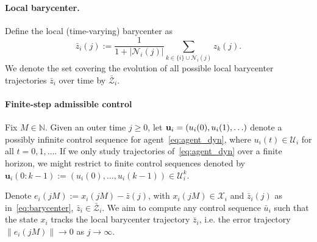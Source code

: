\documentclass[12pt,draftcls,onecolumn]{IEEEtran}
\def\field#1{\mathbb #1}%
\def\N{\field{N}}%
\newcommand{\X}{\ensuremath{\mathcal X}}
\newcommand{\U}{\ensuremath{\mathcal U}}
\def\Zb{\bar{\mathcal{Z}}}
\def\zbi{\bar{z}_i}
\begin{document}
\paragraph{Local barycenter.}
Define the local (time-varying) barycenter as
\begin{equation}\label{eq:barycenter}
\bar z_i(j):=\frac{1}{1+|\mathcal{N}_i(j)|}\sum_{k\in\{i\}\cup\mathcal{N}_i(j)} z_k(j).    
\end{equation}
We denote the set covering the evolution of all possible local barycenter trajectories $\zbi$ over time by $\Zb_i$.

\paragraph{Finite-step admissible control}
Fix $M\in\N$.
Given an outer time $j \geq 0$, let ${\bf u}_i = (u_i(0), u_i(1), \ldots)$ denote a possibly infinite control sequence for agent~\eqref{eq:agent_dyn}, where $u_i(t)\in \U_i$ for all $t=0,1,\ldots$.
If we only study trajectories of~\eqref{eq:agent_dyn} over a finite horizon, we might restrict to finite control sequences denoted by $\mathbf{u}_i(0:k-1) := (u_i(0),\dots,u_i(k-1)) \in \U_i^k$.


Denote $e_i (jM) := x_i(jM) - \bar{z}(j)$, with $x_i(jM) \in \X_i$ and $\bar{z}_i(j)$ as in~\eqref{eq:barycenter}, $\bar{z}_i \in \Zb_i$.
We aim to compute any control sequence $\bar{u}_i$ such that the state $x_i$ tracks the local barycenter trajectory $\bar{z}_i$, i.e. the error trajectory $\|e_i(jM)\| \to 0$ as $j \to \infty$.
\end{document}
